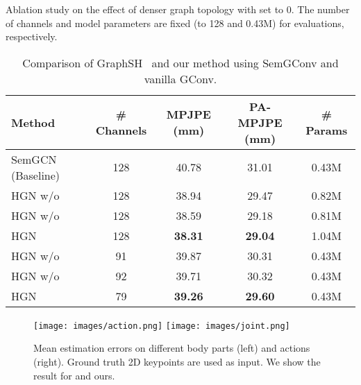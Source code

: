 \documentclass{bmvc2k}
\begin{document}
\begin{table}[!t]
\renewcommand{\baselinestretch}{1.0}
\renewcommand{\arraystretch}{1.0}
\setlength{\abovecaptionskip}{-2pt}
\small
\centering
\caption{Ablation study on the effect of denser graph topology with  set to 0. The number of channels and model parameters are fixed (to 128 and 0.43M) for evaluations, respectively. }\begin{tabular}{l|c|c|c|c}
\hline
Method &\# Channels&MPJPE (mm)&PA-MPJPE (mm)&\# Params \\ \hline\hline
SemGCN (Baseline)~\cite{zhao2019semantic}&128& 40.78 &31.01&0.43M \\\hline
HGN w/o  &128& 38.94& 29.47& 0.82M \\  \hline
HGN w/o  & 128&38.59&29.18&0.81M\\ \hline
HGN & 128&{\bf38.31}& {\bf29.04}& 1.04M \\ \hline
\hline
HGN w/o  &91&39.87&30.31&0.43M \\  \hline
HGN w/o &92&39.71&30.32&0.43M \\ \hline
HGN&79&{\bf39.26}&{\bf29.60}&0.43M \\ \hline
\end{tabular}
\label{table:compare with GSH_control_channel}
\small
\centering
\renewcommand\tabcolsep{1pt}
\setlength{\belowcaptionskip}{-2pt}
\caption{Comparison of GraphSH~\cite{2021Graph} and our method using SemGConv and vanilla GConv.}\label{table:compare with GSH}
\end{table}
\begin{figure}[!t]
\renewcommand{\baselinestretch}{1.0}
\setlength{\abovecaptionskip}{-5pt}
\setlength{\belowcaptionskip}{-5pt}
\centering
\vspace{-5pt}
\texttt{[image: images/action.png]}
\texttt{[image: images/joint.png]}
\caption{Mean estimation errors on different body parts (left) and  actions (right). Ground truth 2D keypoints are used as input. We show the result for \cite{zhao2019semantic} and ours.}\label{fig-action&joint}
\end{figure}
\end{document}
